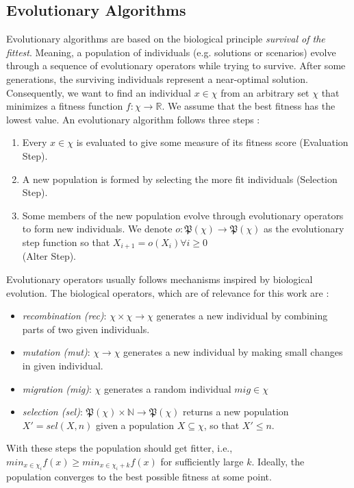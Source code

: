 \subsection{Evolutionary Algorithms}
\label{evolutionaryalgorithms}
Evolutionary algorithms are based on the biological principle \textit{survival of the fittest}. Meaning, a population of individuals (e.g. solutions or scenarios) evolve through a sequence of evolutionary operators while trying to survive. After some generations, the surviving individuals represent a near-optimal solution.\\
Consequently, we want to find an individual $x \in \chi$ from an arbitrary set $\chi$ that minimizes a fitness function $f : \chi \rightarrow \mathbb{R}$. We assume that the best fitness has the lowest value. An evolutionary algorithm follows three steps \cite{michalewicz93}:
\begin{description}
   \begin{enumerate}
      \item Every $x \in \chi$ is evaluated to give some measure of its fitness score
      (Evaluation Step).
      \item A new population is formed by selecting the more fit individuals (Selection Step).
      \item Some members of the new population evolve through evolutionary operators to form new individuals. We denote $o:\mathfrak{P}(\chi)\rightarrow \mathfrak{P}(\chi)$ as the evolutionary step function so that $X_{i+1} = o(X_i)\forall i \ge 0$\\ (Alter Step).
   \end{enumerate}
\end{description}
Evolutionary operators usually follows mechanisms inspired by biological evolution. The biological operators, which are of relevance for this work are \cite{gabor19}:
\begin{description}
   \begin{itemize}
      \item \textit{recombination (rec)}: $\chi \times \chi \rightarrow \chi$ generates a new individual by combining parts of two given individuals.
      \item \textit{mutation (mut)}: $\chi \rightarrow \chi$ generates a new individual by making small changes in given individual.
      \item \textit{migration (mig)}: $\chi$ generates a random individual $mig \in \chi$
      \item \textit{selection (sel)}: $\mathfrak{P} (\chi) \times \mathbb{N} \rightarrow \mathfrak{P}(\chi)$ returns a new population\\
      $X' = sel(X,n)$ given a population $X \subseteq \chi$, so that $X' \le n$.
   \end{itemize}
\end{description}
With these steps the population should get fitter, i.e., $min_{x \in \chi_i} f(x) \ge min_{x \in \chi_i+k} f(x)$ for sufficiently large $k$. Ideally, the population converges to the best possible fitness at some point.

